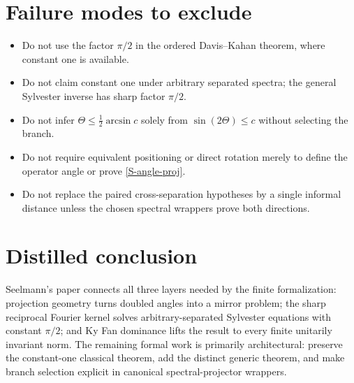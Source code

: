\section{Failure modes to exclude}

\begin{itemize}[leftmargin=2em]
\item Do not use the factor $\pi/2$ in the ordered Davis--Kahan theorem, where constant one is available.
\item Do not claim constant one under arbitrary separated spectra; the general Sylvester inverse has sharp factor $\pi/2$.
\item Do not infer $\Theta\le\frac12\arcsin c$ solely from $\sin(2\Theta)\le c$ without selecting the branch.
\item Do not require equivalent positioning or direct rotation merely to define the operator angle or prove \eqref{S-angle-proj}.
\item Do not replace the paired cross-separation hypotheses by a single informal distance unless the chosen spectral wrappers prove both directions.
\end{itemize}

\section*{Distilled conclusion}

Seelmann's paper connects all three layers needed by the finite formalization: projection geometry turns doubled angles into a mirror problem; the sharp reciprocal Fourier kernel solves arbitrary-separated Sylvester equations with constant $\pi/2$; and Ky Fan dominance lifts the result to every finite unitarily invariant norm. The remaining formal work is primarily architectural: preserve the constant-one classical theorem, add the distinct generic theorem, and make branch selection explicit in canonical spectral-projector wrappers.


